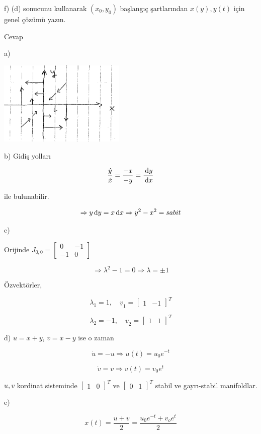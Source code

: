 \documentclass[12pt,fleqn]{article}\usepackage{../../common}
\begin{document}
f) (d) sonucunu kullanarak $(x_0,y_0)$ başlangıç şartlarından $x(y),y(t)$ için
genel çözümü yazın.

Cevap

a)

\includegraphics[height=4cm]{12_05.png}

b) Gidiş yolları

$$ \frac{\dot{y}}{\dot{x}} = \frac{-x}{-y} = \frac{\,\mathrm{d} y}{\,\mathrm{d} x} $$

ile bulunabilir.

$$ \Rightarrow y\,\mathrm{d} y = x \,\mathrm{d} x \Rightarrow y^2 - x^2 = sabit$$

c)

Orijinde $J_{0,0} = \left[\begin{array}{rr}
0 & -1 \\ -1 & 0
\end{array}\right]$

$$ \Rightarrow \lambda^2 - 1 = 0 \Rightarrow \lambda = \pm 1 $$

Özvektörler,

$$ \lambda_1=1, \quad \underline{v}_1 = \left[\begin{array}{cc}1&-1\end{array}\right]^T $$

$$ \lambda_2=-1, \quad \underline{v}_2 = \left[\begin{array}{cc}1&1\end{array}\right]^T $$

d) $u=x+y$, $v=x-y$ ise o zaman 

$$ \dot{u} = -u \Rightarrow u(t) = u_0 e^{-t} $$

$$ \dot{v} = v \Rightarrow v(t) = v_0 e^{t} $$

$u,v$ kordinat sisteminde $\left[\begin{array}{cc}1&0\end{array}\right]^T$ ve
$\left[\begin{array}{cc}0&1\end{array}\right]^T$ stabil ve gayrı-stabil
manifoldlar. 

e)

$$ x(t) = \frac{u+v}{2} = \frac{u_0 e^{-t} + v_o e^{t}}{2} $$
\end{document}
